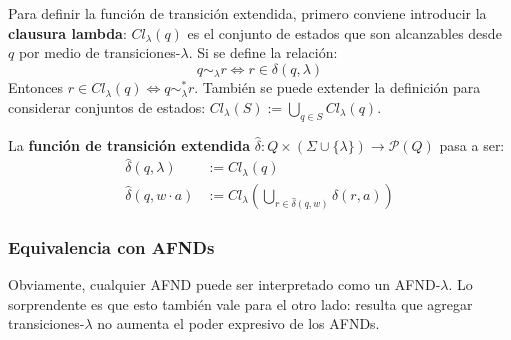 Para definir la función de transición extendida, primero conviene introducir la \textbf{clausura lambda}: $Cl_\lambda(q)$ es el conjunto de estados que son alcanzables desde $q$ por medio de transiciones-$\lambda$. Si se define la relación:
$$q \sim_\lambda r \iff r \in \delta(q, \lambda)$$
Entonces $r \in Cl_\lambda(q) \iff q \sim_\lambda^* r$. También se puede extender la definición para considerar conjuntos de estados: $Cl_\lambda(S) := \bigcup_{q \in S} Cl_\lambda(q)$.

La \textbf{función de transición extendida} $\hat \delta : Q \times (\Sigma \cup \{\lambda\}) \to \mathcal P (Q)$ pasa a ser:
$$
    \begin{aligned}
        \hat \delta (q, \lambda)   & := Cl_\lambda(q)                                                          \\
        \hat \delta (q, w \cdot a) & := Cl_\lambda\left(\bigcup_{r \in \hat \delta(q, w)} \delta(r, a) \right)
    \end{aligned}
$$

\subsubsection{Equivalencia con AFNDs}

Obviamente, cualquier AFND puede ser interpretado como un AFND-$\lambda$. Lo sorprendente es que esto también vale para el otro lado: resulta que agregar transiciones-$\lambda$ no aumenta el poder expresivo de los AFNDs.

